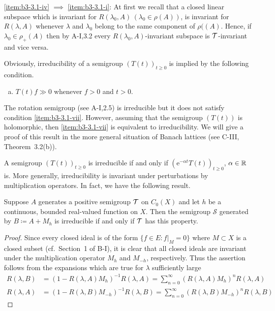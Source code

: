 \ref{item:b3-3.1-iv} $\implies$ \ref{item:b3-3.1-i}: At first we recall that a closed linear subspace which is invariant for $R(\lambda_0,A)\ (\lambda_0 \in \rho(A))$, is invariant for $R(\lambda ,A)$
whenever $\lambda$ and $\lambda_0$ belong to the same component of $\rho((A)$. 
Hence, if $\lambda_0 \in \rho_{+}(A)$ then by A-I,3.2 every $R(\lambda_0,A)$-invariant subspace is 
$\mathcal{T}$-invariant and vice versa.
\begin{remark}\label{rem:b3-3.2}
	Obviously, irreducibility of a semigroup $(T(t))_{t\geq 0}$ is implied by the following condition.
\begin{enumerate}[(g)]	
\item\label{item:b3-3.1-vii}
$T(t)f \gg 0$ whenever $f > 0$ and $t > 0$.
\end{enumerate}
The rotation semigroup (see A-I,2.5) is irreducible but it does not satisfy condition \ref{item:b3-3.1-vii}.
	However, assuming that the semigroup $(T(t))$ is holomorphic, then \ref{item:b3-3.1-vii}
	is equivalent to irreducibility.
	We will give a proof of this result in the more general situation of Banach lattices (see C-III, Theorem~3.2(b)).
\end{remark}
A semigroup $(T(t))_{t \ge 0}$ is irreducible if and only if $(\mathrm{e}^{-\alpha t}T(t))_{t \ge 0}$, $\alpha \in \mathbb{R}$  is. 
More generally, irreducibility is invariant under perturbations by multiplication operators. 
In fact, we have the following result. 
\begin{proposition}\label{prop:b3-3.3}
%
	Suppose $A$ generates a positive semigroup $\mathcal{T}$ on $C_{0}(X)$ and let $h$ be a continuous, bounded real-valued function on $X$.
	Then the semigroup $\mathcal{S}$ generated by $B \coloneqq A + M_{h}$ is irreducible if and only if\/ $\mathcal{T}$ has this property.
\end{proposition}
\begin{proof}
	Since every closed ideal is of the form $\{f \in E \colon f|_{M} = 0\}$ where $M \subset X$ is a closed subset (cf.\ Section~1 of B-I), it is clear that all closed ideals are invariant under the multiplication operator $M_{h}$ and $M_{-h}$, respectively.
	Thus the assertion follows from the expansions which are true for $\lambda$ sufficiently large
\begin{align*}
R(\lambda,B) &= (1 - R(\lambda,A)M_{h})^{-1}R(\lambda,A) 
	= \sum_{n=0}^{\infty} (R(\lambda,A)M_{h})^{n}R(\lambda,A) \\
R(\lambda,A) &= (1 - R(\lambda,B)M_{-h})^{-1}R(\lambda,B) = \sum_{n=0}^{\infty} (R(\lambda,B)M_{-h})^{n}R(\lambda,B)
\end{align*} 
\end{proof}
